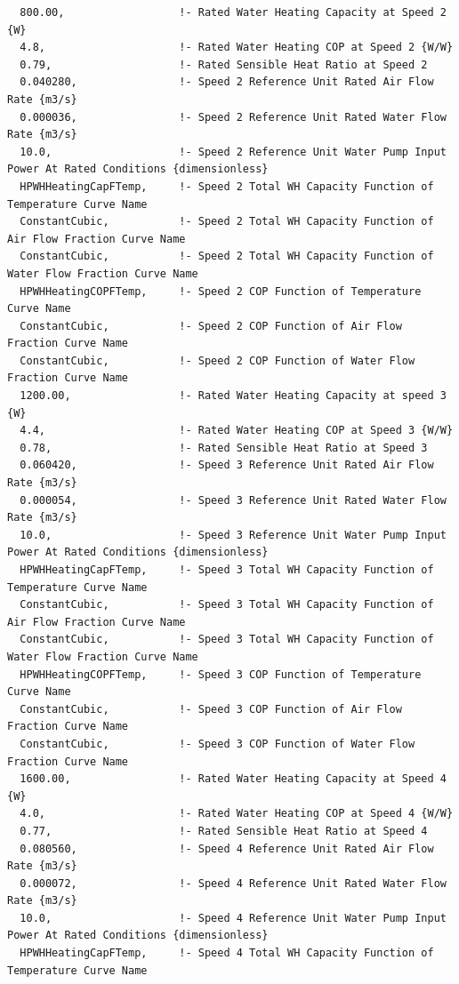 \begin{lstlisting}
  800.00,                  !- Rated Water Heating Capacity at Speed 2 {W}
  4.8,                     !- Rated Water Heating COP at Speed 2 {W/W}
  0.79,                    !- Rated Sensible Heat Ratio at Speed 2
  0.040280,                !- Speed 2 Reference Unit Rated Air Flow Rate {m3/s}
  0.000036,                !- Speed 2 Reference Unit Rated Water Flow Rate {m3/s}
  10.0,                    !- Speed 2 Reference Unit Water Pump Input Power At Rated Conditions {dimensionless}
  HPWHHeatingCapFTemp,     !- Speed 2 Total WH Capacity Function of Temperature Curve Name
  ConstantCubic,           !- Speed 2 Total WH Capacity Function of Air Flow Fraction Curve Name
  ConstantCubic,           !- Speed 2 Total WH Capacity Function of Water Flow Fraction Curve Name
  HPWHHeatingCOPFTemp,     !- Speed 2 COP Function of Temperature Curve Name
  ConstantCubic,           !- Speed 2 COP Function of Air Flow Fraction Curve Name
  ConstantCubic,           !- Speed 2 COP Function of Water Flow Fraction Curve Name
  1200.00,                 !- Rated Water Heating Capacity at speed 3 {W}
  4.4,                     !- Rated Water Heating COP at Speed 3 {W/W}
  0.78,                    !- Rated Sensible Heat Ratio at Speed 3
  0.060420,                !- Speed 3 Reference Unit Rated Air Flow Rate {m3/s}
  0.000054,                !- Speed 3 Reference Unit Rated Water Flow Rate {m3/s}
  10.0,                    !- Speed 3 Reference Unit Water Pump Input Power At Rated Conditions {dimensionless}
  HPWHHeatingCapFTemp,     !- Speed 3 Total WH Capacity Function of Temperature Curve Name
  ConstantCubic,           !- Speed 3 Total WH Capacity Function of Air Flow Fraction Curve Name
  ConstantCubic,           !- Speed 3 Total WH Capacity Function of Water Flow Fraction Curve Name
  HPWHHeatingCOPFTemp,     !- Speed 3 COP Function of Temperature Curve Name
  ConstantCubic,           !- Speed 3 COP Function of Air Flow Fraction Curve Name
  ConstantCubic,           !- Speed 3 COP Function of Water Flow Fraction Curve Name
  1600.00,                 !- Rated Water Heating Capacity at Speed 4 {W}
  4.0,                     !- Rated Water Heating COP at Speed 4 {W/W}
  0.77,                    !- Rated Sensible Heat Ratio at Speed 4
  0.080560,                !- Speed 4 Reference Unit Rated Air Flow Rate {m3/s}
  0.000072,                !- Speed 4 Reference Unit Rated Water Flow Rate {m3/s}
  10.0,                    !- Speed 4 Reference Unit Water Pump Input Power At Rated Conditions {dimensionless}
  HPWHHeatingCapFTemp,     !- Speed 4 Total WH Capacity Function of Temperature Curve Name

\end{lstlisting}
